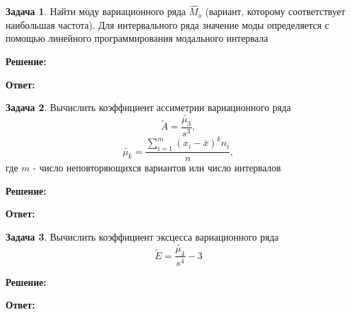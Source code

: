 \documentclass[a4paper,12pt]{article}
\theoremstyle{definition}
\newtheorem{problem}{Задача}
\newenvironment{solution}
{\begin{shaded}\textbf{Решение:}\par}
{\end{shaded}}
\newenvironment{answer}
{\par\noindent\textbf{Ответ:} \color{blue}}
{\par}
\begin{document}
\vspace{8pt}
\begin{problem}
    Найти моду вариационного ряда \(\hat{M_o}\) (вариант, которому соответствует
    наибольшая частота). Для интервального ряда значение моды определяется с
    помощью линейного программирования модального интервала
    
        \begin{solution}
        \end{solution}
    
        \begin{answer}
        \end{answer}
    
    \end{problem}




\vspace{8pt}
\begin{problem}
    Вычислить коэффициент ассиметрии вариационного ряда
    \[\tilde{A} = \frac{\tilde{\mu_3}}{s^3},\]
    \[\tilde{\mu_k} = \frac{\sum^m_{i=1}(x_i - \bar{x})^k n_i}{n},\]
    где \(m\) - число неповторяющихся вариантов или число интервалов     
        \begin{solution}
        \end{solution}
    
        \begin{answer}
        \end{answer}
    
    \end{problem}

\vspace{8pt}
\begin{problem}
    Вычислить коэффициент эксцесса вариационного ряда
    \[\tilde{E} = \frac{\tilde{\mu_4}}{s^4} - 3\]
    
        \begin{solution}
        \end{solution}
    
        \begin{answer}
        \end{answer}
    
    \end{problem}
\end{document}
